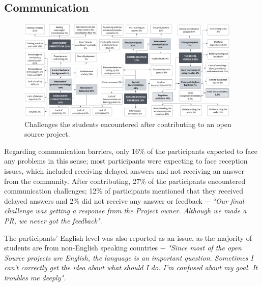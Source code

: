 \documentclass[sigconf]{acmart}
\begin{document}
\begin{sloppy}


\subsection{Communication}

\begin{figure}
    \centering
    \includegraphics[width=0.95\textwidth]{AFTERFINAL2.png}
    \caption{Challenges the students encountered after contributing to an open source project.}
    \label{fig:after}
    \vspace{-3mm}
\end{figure}

Regarding communication barriers, only 16\% of the participants expected to face any problems in this sense; most participants were expecting to face reception issues, which included receiving delayed answers and not receiving an answer from the community. After contributing, 27\% of the participants encountered communication challenges; 12\% of participants mentioned that they received delayed answers and 2\% did not receive any answer or feedback $-$ \textit{"Our final challenge was getting a response from the Project owner. Although we made a PR, we never got the feedback"}. 


The participants' English level was also reported as an issue, as the majority of students are from non-English speaking countries $-$ \textit{"Since most of the open Source projects are English, the language is an important question. Sometimes I can't correctly get the idea about what should I do. I'm confused about my goal. It troubles me deeply".}


\end{sloppy}
\end{document}
